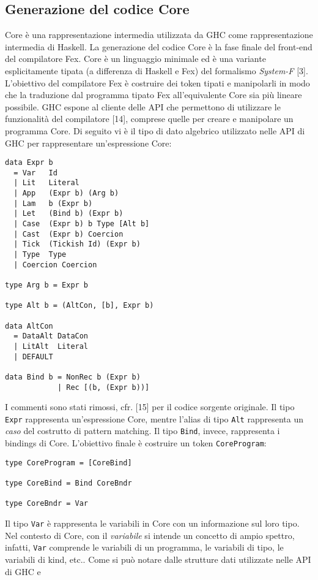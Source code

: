 \documentclass[10pt,a4paper]{article}
\begin{document}
\subsection{Generazione del codice Core}
Core è una rappresentazione intermedia utilizzata da GHC come rappresentazione intermedia di Haskell. La generazione
del codice Core è la fase finale del front-end del compilatore Fex. Core è un linguaggio minimale ed è una variante
esplicitamente tipata (a differenza di Haskell e Fex) del formalismo \textit{System-F} [3]. L'obiettivo del compilatore
Fex è costruire dei token tipati e manipolarli in modo che la traduzione dal programma tipato Fex all'equivalente
Core sia più lineare possibile. GHC espone al cliente delle API che permettono di utilizzare le funzionalità del
compilatore [14], comprese quelle per creare e manipolare un programma Core. Di seguito vi è il tipo di dato algebrico
utilizzato nelle API di GHC per rappresentare un'espressione Core:
\begin{lstlisting}
data Expr b
  = Var   Id
  | Lit   Literal
  | App   (Expr b) (Arg b)
  | Lam   b (Expr b)
  | Let   (Bind b) (Expr b)
  | Case  (Expr b) b Type [Alt b]
  | Cast  (Expr b) Coercion
  | Tick  (Tickish Id) (Expr b)
  | Type  Type
  | Coercion Coercion

type Arg b = Expr b

type Alt b = (AltCon, [b], Expr b)

data AltCon
  = DataAlt DataCon
  | LitAlt  Literal
  | DEFAULT

data Bind b = NonRec b (Expr b)
            | Rec [(b, (Expr b))]
\end{lstlisting}
I commenti sono stati rimossi, cfr. [15] per il codice sorgente originale. Il tipo \texttt{Expr} rappresenta
un'espressione Core, mentre l'alias di tipo \texttt{Alt} rappresenta un \textit{caso} del costrutto di pattern matching.
Il tipo \texttt{Bind}, invece, rappresenta i bindings di Core.
L'obiettivo finale è costruire un token \texttt{CoreProgram}:
\begin{lstlisting}
type CoreProgram = [CoreBind]

type CoreBind = Bind CoreBndr

type CoreBndr = Var
\end{lstlisting}
Il tipo \texttt{Var} è rappresenta le variabili in Core con un informazione sul loro tipo. Nel contesto di Core, con il
\textit{variabile} si intende un concetto di ampio spettro, infatti, \texttt{Var} comprende le variabili di un programma,
le variabili di tipo, le variabili di kind, etc.. Come si può notare dalle strutture dati utilizzate nelle API di GHC e
\end{document}
